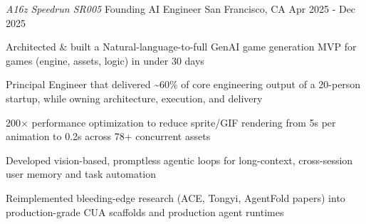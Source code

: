 \begin{cventries}
 \cventry
    {\emph{A16z Speedrun SR005}} %
    {Founding AI Engineer} %
    {San Francisco, CA} %
    {Apr 2025 - Dec 2025} %
    {
    \begin{cvitems} %
        \item {Architected \& built a Natural-language-to-full GenAI game generation MVP for games (engine, assets, logic) in under 30 days}
        \item {Principal Engineer that delivered \textasciitilde60\% of core engineering output of a 20-person startup, while owning architecture, execution, and delivery}
        \item {200$\times$ performance optimization to reduce sprite/GIF rendering from 5s per animation to 0.2s across 78+ concurrent assets}
        \item {Developed vision-based, promptless agentic loops for long-context, cross-session user memory and task automation}
        \item {Reimplemented bleeding-edge research (ACE, Tongyi, AgentFold papers) into production-grade CUA scaffolds and production agent runtimes}
    \end{cvitems}
}

\end{cventries}
